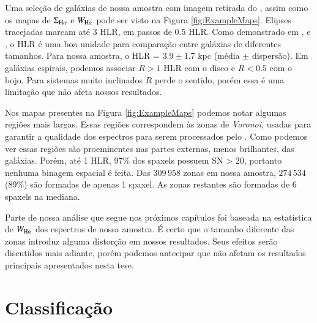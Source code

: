 Uma seleção de galáxias de nossa amostra com imagem retirada do \SDSS, assim como os mapas de $\Sigma_{\Ha}$ e $W_{\Ha}$ pode ser visto na Figura \ref{fig:ExampleMaps}. Elipses tracejadas marcam até 3 HLR, em passos de 0.5 HLR. Como demonstrado em \citet{Perez.etal.2013}, \citet{Sanchez.etal.2014} e \citet{GonzalezDelgado.etal.2016a}, o HLR é uma boa unidade para comparação entre galáxias de diferentes tamanhos. Para nossa amostra, o HLR = $3.9 \pm 1.7$ kpc (média $\pm$ dispersão). Em galáxias espirais, podemos associar $R > 1$ HLR com o disco e $R < 0.5$ com o bojo. Para sistemas muito inclinados $R$ perde o sentido, porém essa é uma limitação que não afeta nossos resultados.

Nos mapas presentes na Figura \ref{fig:ExampleMaps} podemos notar algumas regiões mais largas. Essas regiões correspondem às zonas de {\em Voronoi}, usadas para garantir a qualidade dos espectros para serem processados pelo \starlight. Como podemos ver essas regiões são proeminentes nas partes externas, menos brilhantes, das galáxias. Porém, até 1 HLR, 97\% dos spaxels possuem SN > 20, portanto nenhuma binagem espacial é feita. Das $309\,958$ zonas em nossa amostra, $274\,534$ (89\%) são formadas de apenas 1 spaxel. As zonas restantes são formadas de 6 spaxels na mediana.

Parte de nossa análise que segue nos próximos capítulos foi baseada na estatística de $W_{\Ha}$ dos espectros de nossa amostra. É certo que o tamanho diferente das zonas introduz alguma distorção em nossos resultados. Seus efeitos serão discutidos mais adiante, porém podemos antecipar que não afetam os resultados principais apresentados nesta tese.




\chapter{Classificação}
\label{sec:DIGclass}

